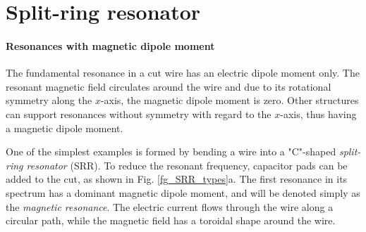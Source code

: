 %     
\FloatBarrier %
\section{Split-ring resonator} \label{section_srr} %
\paragraph{Resonances with magnetic dipole moment}%
The fundamental resonance in a cut wire has an electric dipole moment only. The resonant magnetic field circulates around the wire and due to its rotational symmetry along the $x$-axis, the magnetic dipole moment is zero. Other structures can support resonances without symmetry with regard to the $x$-axis, thus having a magnetic dipole moment.

One of the simplest examples is formed by bending a wire into a "C"-shaped \textit{split-ring resonator} (SRR). To reduce the resonant frequency, capacitor pads can be added to the cut, as shown in Fig. \ref{fg_SRR_types}a. The first resonance in its spectrum has a dominant magnetic dipole moment, and will be denoted simply as the \textit{magnetic resonance}. The electric current flows through the wire along a circular path, while the magnetic field has a toroidal shape around the wire.   

